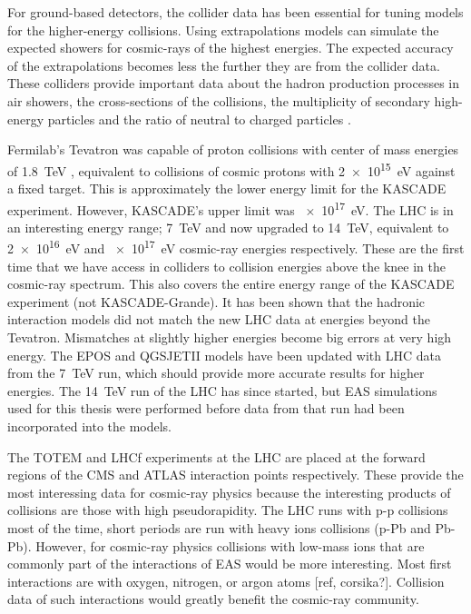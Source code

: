 For ground-based detectors, the collider data has been essential for tuning models for the higher-energy collisions. Using extrapolations models can simulate the expected showers for cosmic-rays of the highest energies. The expected accuracy of the extrapolations becomes less the further they are from the collider data. These colliders provide important data about the hadron production processes in air showers, the cross-sections of the collisions, the multiplicity of secondary high-energy particles and the ratio of neutral to charged particles \cite{pierog2008lhc}.

Fermilab's Tevatron was capable of proton collisions with center of mass energies of \SI{1.8}{\TeV} \cite{abe1994tevatron}, equivalent to collisions of cosmic protons with \SI{2e15}{\eV} against a fixed target. This is approximately the lower energy limit for the KASCADE experiment. However, KASCADE's upper limit was \SI{e17}{\eV}. The LHC is in an interesting energy range; \SI{7}{\TeV} and now upgraded to \SI{14}{\TeV}, equivalent to \SI{2e16}{\eV} and \SI{e17}{\eV} cosmic-ray energies respectively. These are the first time that we have access in colliders to collision energies above the knee in the cosmic-ray spectrum. This also covers the entire energy range of the KASCADE experiment (not KASCADE-Grande). It has been shown that the hadronic interaction models did not match the new LHC data at energies beyond the Tevatron. Mismatches at slightly higher energies become big errors at very high energy. The EPOS and QGSJETII models have been updated with LHC data from the \SI{7}{\TeV} run, which should provide more accurate results for higher energies. The \SI{14}{\TeV} run of the LHC has since started, but EAS simulations used for this thesis were performed before data from that run had been incorporated into the models.

The TOTEM and LHCf experiments at the LHC are placed at the forward regions of the CMS and ATLAS interaction points respectively. These provide the most interessing data for cosmic-ray physics because the interesting products of collisions are those with high pseudorapidity. The LHC runs with p-p collisions most of the time, short periods are run with heavy ions collisions (p-Pb and Pb-Pb). However, for cosmic-ray physics collisions with low-mass ions that are commonly part of the interactions of EAS would be more interesting. Most first interactions are with oxygen, nitrogen, or argon atoms [ref, corsika?]. Collision data of such interactions would greatly benefit the cosmic-ray community.


